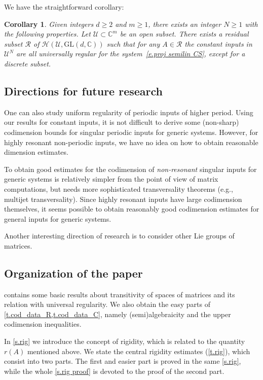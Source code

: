 \documentclass[10pt, a4paper]{amsart}
\theoremstyle{plain}
\newtheorem{corol}[lemma]{Corollary}
\theoremstyle{definition}
\theoremstyle{remark}
\theoremstyle{note}
\numberwithin{equation}{section}
\begin{document}
We have the straightforward corollary:

\begin{corol}
Given integers $d\ge 2$ and $m \ge 1$, there exists an integer $N\ge 1$ with the following properties.
Let ${\mathcal{U}}\subset {\mathbb{C}}^m$ be an open subset. There exists a residual subset $\mathcal{R}$ of $\mathcal{H}({\mathcal{U}}, {\mathrm{GL}}(d,{\mathbb{C}}))$
such that for any $A \in \mathcal{R}$ the constant inputs in ${\mathcal{U}}^N$ are all universally regular for  the  system~\eqref{e.proj semilin CS}, except for a discrete subset.
\end{corol}

\subsection{Directions for future research}

One can also study uniform regularity of periodic inputs of higher period.
Using our results for constant inputs, it is not difficult 
to derive some (non-sharp) codimension bounds for singular periodic inputs for generic systems.
However, for highly resonant non-periodic inputs, we have no idea on how to obtain reasonable dimension estimates. 

To obtain good estimates for the codimension of \emph{non-resonant}
singular inputs for generic systems is relatively simpler from the point of view of matrix computations,
but needs more sophisticated transversality theorems (e.g., multijet transversality).
Since highly resonant inputs have large codimension themselves,
it seems possible to obtain reasonably good codimension estimates for general inputs for generic systems.

Another interesting direction of research is to consider other Lie groups of matrices.

\subsection{Organization of the paper}\label{ss.organization}

 contains some basic results about 
transitivity of spaces of matrices and its relation with universal regularity.
We also obtain the easy parts of \cref{t.cod_data_R,t.cod_data_C}, namely
(semi)algebraicity and the upper codimension inequalities.

In \cref{s.rig} we introduce the concept of rigidity, which is related to the quantity $r(A)$
mentioned above. We state the central rigidity estimates (\cref{t.rig}), which
consist into two parts. The first and easier part is proved in the same \cref{s.rig},
while the whole \cref{s.rig proof} is devoted to the proof of the second part.
\end{document}
